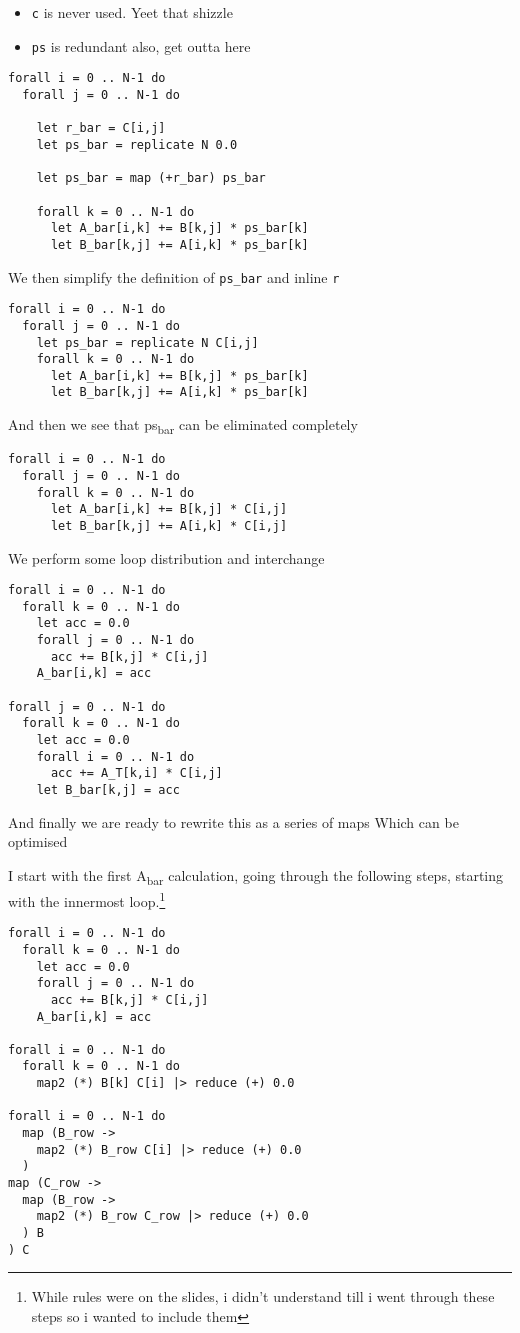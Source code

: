 \documentclass[11pt]{article}
\begin{document}
\begin{itemize}
\item \texttt{c} is never used. Yeet that shizzle
\item \texttt{ps} is redundant also, get outta here
\end{itemize}
\begin{verbatim}
forall i = 0 .. N-1 do
  forall j = 0 .. N-1 do

    let r_bar = C[i,j]
    let ps_bar = replicate N 0.0

    let ps_bar = map (+r_bar) ps_bar

    forall k = 0 .. N-1 do
      let A_bar[i,k] += B[k,j] * ps_bar[k]
      let B_bar[k,j] += A[i,k] * ps_bar[k]
\end{verbatim}

We then simplify the definition of \texttt{ps\_bar} and inline \texttt{r}

\begin{verbatim}
forall i = 0 .. N-1 do
  forall j = 0 .. N-1 do
    let ps_bar = replicate N C[i,j]
    forall k = 0 .. N-1 do
      let A_bar[i,k] += B[k,j] * ps_bar[k]
      let B_bar[k,j] += A[i,k] * ps_bar[k]
\end{verbatim}

And then we see that ps\textsubscript{bar} can be eliminated completely
\begin{verbatim}
forall i = 0 .. N-1 do
  forall j = 0 .. N-1 do
    forall k = 0 .. N-1 do
      let A_bar[i,k] += B[k,j] * C[i,j]
      let B_bar[k,j] += A[i,k] * C[i,j]
\end{verbatim}

We perform some loop distribution and interchange
\begin{verbatim}
forall i = 0 .. N-1 do
  forall k = 0 .. N-1 do
    let acc = 0.0
    forall j = 0 .. N-1 do
      acc += B[k,j] * C[i,j] 
    A_bar[i,k] = acc

forall j = 0 .. N-1 do
  forall k = 0 .. N-1 do
    let acc = 0.0
    forall i = 0 .. N-1 do
      acc += A_T[k,i] * C[i,j]
    let B_bar[k,j] = acc
\end{verbatim}

And finally we are ready to rewrite this as a series of maps
Which can be optimised  

I start with the first A\textsubscript{bar} calculation, going through the following
steps, starting with the innermost loop.\footnote{While rules were on the
slides, i didn't understand till i went through these steps so i wanted
to include them}
\begin{verbatim}
forall i = 0 .. N-1 do
  forall k = 0 .. N-1 do
    let acc = 0.0
    forall j = 0 .. N-1 do
      acc += B[k,j] * C[i,j] 
    A_bar[i,k] = acc

forall i = 0 .. N-1 do
  forall k = 0 .. N-1 do
    map2 (*) B[k] C[i] |> reduce (+) 0.0

forall i = 0 .. N-1 do
  map (B_row -> 
    map2 (*) B_row C[i] |> reduce (+) 0.0
  ) 
map (C_row ->
  map (B_row -> 
    map2 (*) B_row C_row |> reduce (+) 0.0
  ) B
) C
\end{verbatim}
\end{document}
